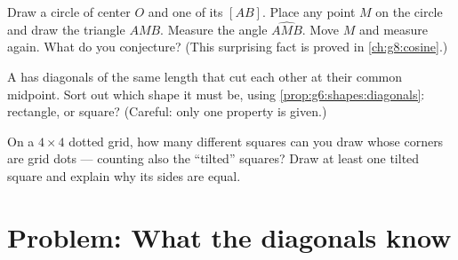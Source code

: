 \begin{exercise}[$\star\star$]\label{exo:g6:shapes:10}
Draw a circle of center $O$ and one of its  $[AB]$. Place any
point $M$ on the circle and draw the triangle $AMB$. Measure the angle
$\widehat{AMB}$. Move $M$ and measure again. What do you conjecture?
(This surprising fact is proved in \cref{ch:g8:cosine}.)
\end{exercise}

\begin{exercise}[$\star\star$]\label{exo:g6:shapes:11}
A  has diagonals of the same length that cut each other at
their common midpoint. Sort out which shape it must be, using
\cref{prop:g6:shapes:diagonals}: rectangle,  or square?
(Careful: only one property is given.)
\end{exercise}

\begin{exercise}[$\star\star\star$]\label{exo:g6:shapes:12}
On a $4 \times 4$ dotted grid, how many different squares can you draw
whose corners are grid dots --- counting also the ``tilted'' squares?
Draw at least one tilted square and explain why its sides are equal.
\end{exercise}

\section{Problem: What the diagonals know}

